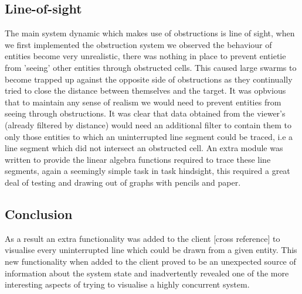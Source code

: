 \subsection{Line-of-sight}
The main system dynamic which makes use of obstructions is line of sight, when we first implemented the obstruction system we observed the behaviour of entities become very unrealistic, there was nothing in place to prevent entietie from 'seeing' other entities through obstructed cells. This caused large swarms to become trapped up against the opposite side of obstructions as they continually tried to close the distance between themselves and the target. It was opbvious that to maintain any sense of realism we would need to prevent entities from seeing through obstructions.
It was clear that data obtained from the viewer's (already filtered by distance) would need an additional filter to contain them to only those entities to which an uninterrupted line segment could be traced, i.e a line segment which did not intersect an obstructed cell. An extra module was written to provide the linear algebra functions required to trace these line segments, again a seemingly simple task in task hindsight, this required a great deal of testing and drawing out of graphs with pencils and paper.
\subsection{Conclusion}
As a result an extra functionality was added to the client [cross reference] to visualise every uninterrupted line which could be drawn from a given entity. This new functionality when added to the client proved to be an unexpected source of information about the system state and inadvertently revealed one of the more interesting aspects of trying to visualise a highly concurrent system.

\clearpage
\endinput
